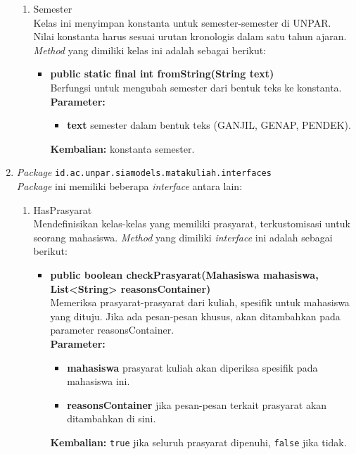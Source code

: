 \begin{enumerate}
\begin{enumerate}
		\item Semester\\
		Kelas ini menyimpan konstanta untuk semester-semester di UNPAR. Nilai konstanta harus sesuai urutan kronologis dalam satu tahun ajaran. \textit{Method} yang dimiliki kelas ini adalah sebagai berikut:
		\begin{itemize}
			\item \textbf{public static final int fromString(String text)} \\
			Berfungsi untuk mengubah semester dari bentuk teks ke konstanta. \\
			\textbf{Parameter:}
			\begin{itemize}
				\item \textbf{text} semester dalam bentuk teks (GANJIL, GENAP, PENDEK).
			\end{itemize}
			\textbf{Kembalian:} konstanta semester.
		\end{itemize}
	\end{enumerate}
	
	\item \textit{Package} \texttt{id.ac.unpar.siamodels.matakuliah.interfaces}\\
	\textit{Package} ini memiliki beberapa \textit{interface} antara lain:
	\begin{enumerate}
		\item HasPrasyarat\\
		Mendefinisikan kelas-kelas yang memiliki prasyarat, terkustomisasi untuk seorang mahasiswa. \textit{Method} yang dimiliki \textit{interface} ini adalah sebagai berikut: 
		\begin{itemize}
			\item \textbf{public boolean checkPrasyarat(Mahasiswa mahasiswa, List<String> reasonsContainer)} \\
			Memeriksa prasyarat-prasyarat dari kuliah, spesifik untuk mahasiswa yang dituju. Jika ada pesan-pesan khusus, akan ditambahkan pada parameter reasonsContainer.\\
			\textbf{Parameter:}
			\begin{itemize}
				\item \textbf{mahasiswa} prasyarat kuliah akan diperiksa spesifik pada mahasiswa ini.
				\item \textbf{reasonsContainer} jika pesan-pesan terkait prasyarat akan ditambahkan di sini.
			\end{itemize}
			\textbf{Kembalian:} \texttt{true} jika seluruh prasyarat dipenuhi, \texttt{false} jika tidak.
		\end{itemize}
		

\end{enumerate}
\end{enumerate}
